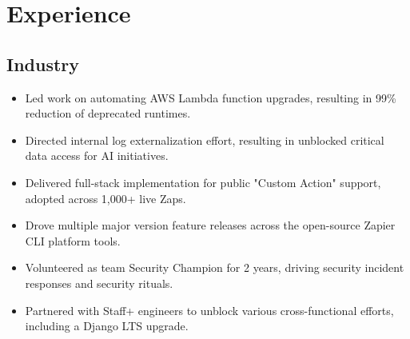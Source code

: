 \documentclass[11pt,a4paper,sans]{moderncv}
\begin{document}
\makecvtitle

\vspace*{-6mm}

\section{Experience}
\subsection{Industry}

{\begin{itemize}
\item Led work on automating AWS Lambda function upgrades, resulting in 99\% reduction of deprecated runtimes.
\item Directed internal log externalization effort, resulting in unblocked critical data access for AI initiatives.
\item Delivered full-stack implementation for public "Custom Action" support, adopted across 1,000+ live Zaps.
\item Drove multiple major version feature releases across the open-source Zapier CLI platform tools.
\item Volunteered as team Security Champion for 2 years, driving security incident responses and security rituals.
\item Partnered with Staff+ engineers to unblock various cross-functional efforts, including a Django LTS upgrade.
\end{itemize}}
\medskip

\medskip
\end{document}
